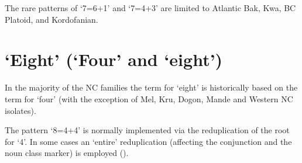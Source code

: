 The rare patterns of ‘7=6+1’ and ‘7=4+3’ are limited to Atlantic Bak, Kwa, BC Platoid, and Kordofanian.

\clearpage
\section{‘Eight’ (‘Four’ and ‘eight’)}%
 
In the majority of the NC families the term for ‘eight’ is historically based on the term for ‘four’ (with the exception of Mel, Kru, Dogon, Mande and Western NC isolates). 

The pattern ‘8=4+4’ is normally implemented via the reduplication of the root for ‘4’. In some cases an ‘entire’ reduplication (affecting the conjunction and the noun class marker) is employed ().  

